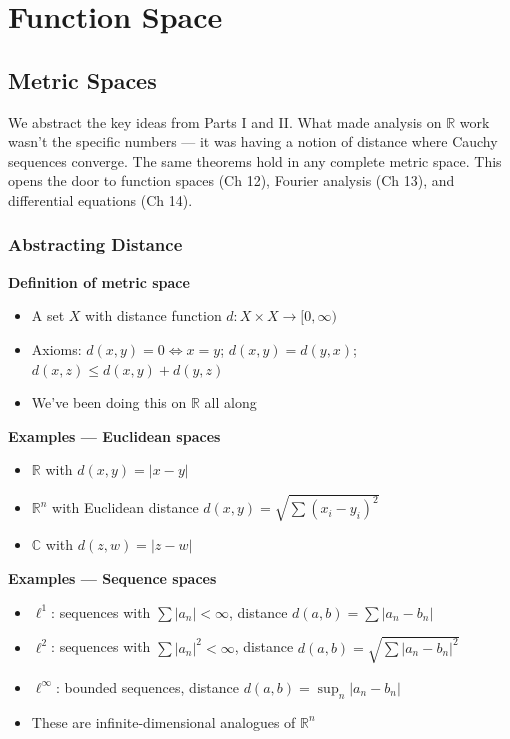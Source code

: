\documentclass[
  10pt,
  letterpaper,
]{scrbook}
\providecommand{\tightlist}{%
  \setlength{\itemsep}{0pt}\setlength{\parskip}{0pt}}
\begin{document}
\part{Function Space}

\chapter{Metric Spaces}\label{metric-spaces}

We abstract the key ideas from Parts I and II. What made analysis on
\(\mathbb{R}\) work wasn't the specific numbers --- it was having a
notion of distance where Cauchy sequences converge. The same theorems
hold in any complete metric space. This opens the door to function
spaces (Ch 12), Fourier analysis (Ch 13), and differential equations (Ch
14).

\section{Abstracting Distance}\label{abstracting-distance}

\textbf{Definition of metric space}

\begin{itemize}
\tightlist
\item
  A set \(X\) with distance function \(d: X \times X \to [0, \infty)\)
\item
  Axioms: \(d(x,y) = 0 \iff x = y\); \(d(x,y) = d(y,x)\);
  \(d(x,z) \leq d(x,y) + d(y,z)\)
\item
  We've been doing this on \(\mathbb{R}\) all along
\end{itemize}

\textbf{Examples --- Euclidean spaces}

\begin{itemize}
\tightlist
\item
  \(\mathbb{R}\) with \(d(x,y) = |x - y|\)
\item
  \(\mathbb{R}^n\) with Euclidean distance
  \(d(x,y) = \sqrt{\sum (x_i - y_i)^2}\)
\item
  \(\mathbb{C}\) with \(d(z,w) = |z - w|\)
\end{itemize}

\textbf{Examples --- Sequence spaces}

\begin{itemize}
\tightlist
\item
  \(\ell^1\): sequences with \(\sum |a_n| < \infty\), distance
  \(d(a,b) = \sum |a_n - b_n|\)
\item
  \(\ell^2\): sequences with \(\sum |a_n|^2 < \infty\), distance
  \(d(a,b) = \sqrt{\sum |a_n - b_n|^2}\)
\item
  \(\ell^\infty\): bounded sequences, distance
  \(d(a,b) = \sup_n |a_n - b_n|\)
\item
  These are infinite-dimensional analogues of \(\mathbb{R}^n\)
\end{itemize}
\end{document}
